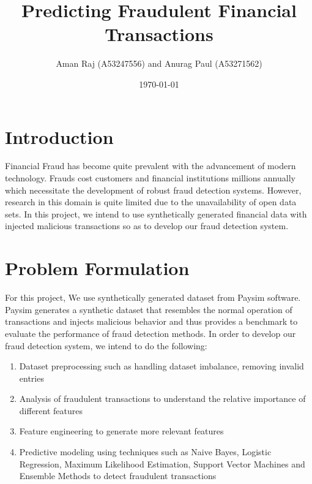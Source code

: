 \documentclass[letterpaper,12pt]{article}
\begin{document}
\title{Predicting Fraudulent Financial Transactions}
\author{Aman Raj (A53247556) and Anurag Paul (A53271562)}
\date{\today}
\maketitle



\section{Introduction}

Financial Fraud has become quite prevalent with the advancement of modern technology. Frauds cost customers and financial institutions millions annually which necessitate the development of robust fraud detection systems. However, research in this domain is quite limited due to the unavailability of open data sets. In this project, we intend to use synthetically generated financial data with injected malicious transactions so as to develop our fraud detection system. 

\section{Problem Formulation}
For this project, We use synthetically generated dataset from Paysim\cite{paysim} software. Paysim generates a synthetic dataset that resembles the normal operation of transactions and injects malicious behavior and thus provides a benchmark to evaluate the performance of fraud detection methods. In order to develop our fraud detection system, we intend to do the following:

\begin{enumerate}
\item Dataset preprocessing such as handling dataset imbalance, removing invalid entries
\item Analysis of fraudulent transactions to understand the relative importance of different features
\item Feature engineering to generate more relevant features
\item Predictive modeling using techniques such as Naive Bayes, Logistic Regression, Maximum Likelihood Estimation, Support Vector Machines and Ensemble Methods to detect fraudulent transactions
\end{enumerate}
\end{document}
